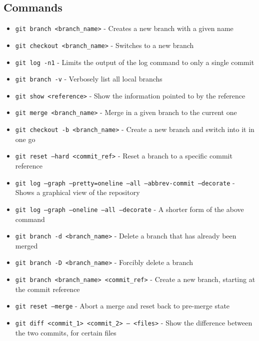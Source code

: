 \subsection{Commands}
\begin{itemize}
\item\texttt{git branch <branch\_name>} - Creates a new branch with a given name

\item\texttt{git checkout <branch\_name>} - Switches to a new branch

\item\texttt{git log -n1} - Limits the output of the log command to only a single commit

\item\texttt{git branch -v} - Verbosely list all local branchs

\item\texttt{git show <reference>} - Show the information pointed to by the reference

\item\texttt{git merge <branch\_name>} - Merge in a given branch to the current one

\item\texttt{git checkout -b <branch\_name>} - Create a new branch and switch into it in one go

\item\texttt{git reset --hard <commit\_ref>} - Reset a branch to a specific commit reference

\item\texttt{git log --graph --pretty=oneline --all \newline --abbrev-commit --decorate} - Shows a graphical view of the repository

\item\texttt{git log --graph --oneline --all --decorate} - A shorter form of the above command

\item\texttt{git branch -d <branch\_name>} - Delete a branch that has already been merged

\item\texttt{git branch -D <branch\_name>} - Forcibly delete a branch

\item\texttt{git branch <branch\_name> <commit\_ref>} - Create a new branch, starting at the commit reference

\item\texttt{git reset --merge} - Abort a merge and reset back to pre-merge state

\item\texttt{git diff <commit\_1> <commit\_2> -- <files>} - Show the difference between the two commits, for certain files

\end{itemize}

